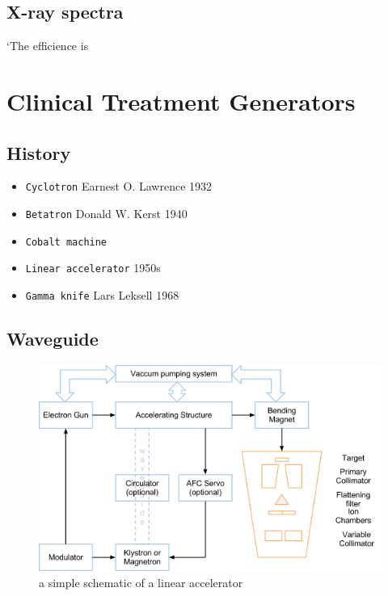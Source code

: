 \documentclass[]{book}
\providecommand{\tightlist}{%
  \setlength{\itemsep}{0pt}\setlength{\parskip}{0pt}}
\theoremstyle{definition}
\theoremstyle{definition}
\theoremstyle{definition}
\theoremstyle{remark}
\begin{document}
\section{X-ray spectra}\label{x-ray-spectra}

`The efficience is

\chapter{Clinical Treatment Generators}\label{gene}

\section{History}\label{history-1}

\begin{itemize}
\tightlist
\item
  \texttt{Cyclotron} Earnest O. Lawrence 1932
\item
  \texttt{Betatron} Donald W. Kerst 1940
\item
  \texttt{Cobalt\ machine}
\item
  \texttt{Linear\ accelerator} 1950s
\item
  \texttt{Gamma\ knife} Lars Leksell 1968
\end{itemize}

\section{Waveguide}\label{waveguide}

\begin{figure}

{\centering \includegraphics[width=7.44in]{figures/components} 

}

\caption{a simple schematic of a linear accelerator}\label{fig:unnamed-chunk-5}
\end{figure}
\end{document}
